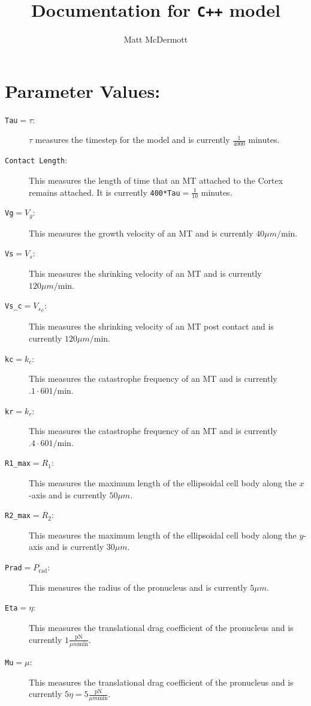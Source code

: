 \documentclass{article}
\author{Matt McDermott}
\title{Documentation for \texttt{C++} model}
\begin{document}
\maketitle
\section{Parameter Values:}
\begin{description}
  \item[\texttt{Tau}$=\tau$:] $\tau$ measures the timestep for the model and is currently
    $\frac{1}{4000}$ minutes. 
  \item[\texttt{Contact Length}:] This measures the length of time that an MT
    attached to the Cortex remains attached. It is currently
    \texttt{400*Tau}$=\frac{1}{10}$ minutes. 
  \item[\texttt{Vg}$=V_g$:] This measures the growth velocity of an MT and is
    currently $40 \mu m/\text{min}$. 
  \item[\texttt{Vs}$=V_s$:] This measures the shrinking velocity of an MT and is
    currently $120 \mu m/\text{min}$. 
  \item[\texttt{Vs\_c}$={V_s}_c$:] This measures the shrinking velocity of an MT
    post contact and is currently $120 \mu m/\text{min}$. 
  \item[\texttt{kc}$=k_c$:] This measures the catastrophe frequency of an MT and
    is currently $.1\cdot 60 1/\text{min}$. 
  \item[\texttt{kr}$=k_r$:] This measures the catastrophe frequency of an MT and
    is currently $.4\cdot 60 1/\text{min}$. 
  \item[\texttt{R1\_max}$=R_1$:] This measures the maximum length of the
    ellipsoidal cell body along the $x$-axis and is currently $50\mu m$.  
  \item[\texttt{R2\_max}$=R_2$:] This measures the maximum length of the
    ellipsoidal cell body along the $y$-axis and is currently $30\mu m$.  
  \item[\texttt{Prad}$=P_{\text{rad}}$:] This measures the radius of the
    pronucleus and is currently $5\mu m$.  
  \item[\texttt{Eta}$=\eta$:] This measures the translational drag coefficient
    of the pronucleus and is currently $1\frac{\text{pN}}{\mu m \text{min}}$. 
  \item[\texttt{Mu}$=\mu$:] This measures the translational drag coefficient
    of the pronucleus and is currently $5\eta = 5\frac{\text{pN}}{\mu m \text{min}}$. 
\end{description}
\end{document}
